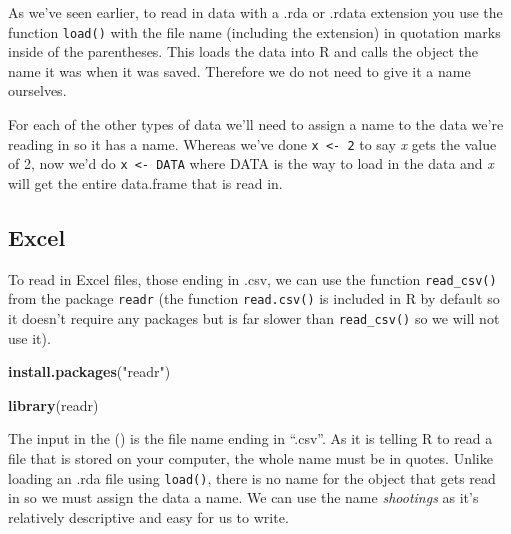 \documentclass[
  12pt,
]{book}
\newenvironment{Shaded}{\begin{snugshade}}{\end{snugshade}}
\newcommand{\KeywordTok}[1]{\textcolor[rgb]{0.27,0.27,0.27}{\textbf{#1}}}
\newcommand{\NormalTok}[1]{#1}
\newcommand{\StringTok}[1]{\textcolor[rgb]{0.5,0.5,0.5}{#1}}
\begin{document}
As we've seen earlier, to read in data with a .rda or .rdata extension you use the function \texttt{load()} with the file name (including the extension) in quotation marks inside of the parentheses. This loads the data into R and calls the object the name it was when it was saved. Therefore we do not need to give it a name ourselves.

For each of the other types of data we'll need to assign a name to the data we're reading in so it has a name. Whereas we've done \texttt{x\ \textless{}-\ 2} to say \emph{x} gets the value of 2, now we'd do \texttt{x\ \textless{}-\ DATA} where DATA is the way to load in the data and \emph{x} will get the entire data.frame that is read in.

\hypertarget{excel}{%
\subsection{Excel}\label{excel}}

To read in Excel files, those ending in .csv, we can use the function \texttt{read\_csv()} from the package \texttt{readr} (the function \texttt{read.csv()} is included in R by default so it doesn't require any packages but is far slower than \texttt{read\_csv()} so we will not use it).

\begin{Shaded}
\begin{Highlighting}[]
\KeywordTok{install.packages}\NormalTok{(}\StringTok{"readr"}\NormalTok{)}
\end{Highlighting}
\end{Shaded}

\begin{Shaded}
\begin{Highlighting}[]
\KeywordTok{library}\NormalTok{(readr)}
\end{Highlighting}
\end{Shaded}

The input in the () is the file name ending in ``.csv''. As it is telling R to read a file that is stored on your computer, the whole name must be in quotes. Unlike loading an .rda file using \texttt{load()}, there is no name for the object that gets read in so we must assign the data a name. We can use the name \emph{shootings} as it's relatively descriptive and easy for us to write.
\end{document}
